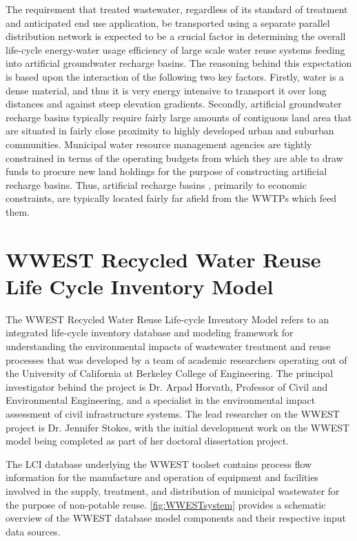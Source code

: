 The requirement that treated wastewater, regardless of its standard of treatment and anticipated end use application, be transported using a separate parallel distribution network is expected to be a crucial factor in determining the overall life-cycle energy-water usage efficiency of large scale water reuse systems feeding into artificial groundwater recharge basins. The reasoning behind this expectation is based upon the interaction of the following two key factors. Firstly,  water is a dense material, and thus it is very energy intensive to transport it over long distances and against steep elevation gradients. Secondly, artificial groundwater recharge basins typically require fairly large amounts of contiguous land area that are situated in fairly close proximity to highly developed urban and suburban communities. Municipal water resource management agencies are tightly constrained in terms of the operating budgets from which they are able to draw funds to procure new land holdings for the purpose of constructing artificial recharge basins. Thus, artificial recharge basins , primarily to economic constraints, are typically located fairly far afield from the WWTPs which feed them.
 
\section{WWEST Recycled Water Reuse Life Cycle Inventory Model}

The WWEST Recycled Water Reuse Life-cycle Inventory Model refers to an integrated life-cycle inventory database and modeling framework for understanding the environmental impacts of wastewater treatment and reuse processes that was developed by a team of academic researchers operating out of the University of California at Berkeley College of Engineering. The principal investigator behind the project is Dr. Arpad Horvath, Professor of Civil and Environmental Engineering, and a specialist in the environmental impact assessment of civil infrastructure systems. The lead researcher on the WWEST project is Dr. Jennifer Stokes, with the initial development work on the WWEST model being completed as part of her doctoral dissertation project.

The LCI database underlying the WWEST toolset contains process flow information for the manufacture and operation of equipment and facilities involved in the supply, treatment, and distribution of municipal wastewater for the purpose of non-potable reuse. \ref{fig:WWESTsystem} 
provides a schematic overview of the WWEST database model components and their respective input data sources.

